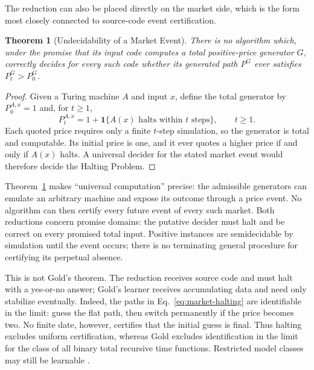 \documentclass[aps,pra,reprint,superscriptaddress,amsmath,amssymb,floatfix]{revtex4-2}
\theoremstyle{plain}
\newtheorem{theorem}{Theorem}
\theoremstyle{definition}
\theoremstyle{remark}
\begin{document}
The reduction can also be placed directly on the market side, which is the
form most closely connected to source-code event certification.

\begin{theorem}[Undecidability of a Market Event]
  \label{thm:market-undecidable}
  There is no algorithm which, under the promise that its input code computes
  a total positive-price generator \(G\), correctly decides for every such
  code whether its generated path \(P^G\) ever satisfies \(P_t^G>P_0^G\).
\end{theorem}

\begin{proof}
Given a Turing machine \(A\) and input \(x\), define the total generator by
\(P_0^{A,x}=1\) and, for \(t\geq1\),
\begin{equation}
  P_t^{A,x}
  =1+\mathbf{1}\{A(x)\text{ halts within }t\text{ steps}\},
  \qquad t\geq1 .
  \label{eq:market-halting}
\end{equation}
Each quoted price requires only a finite \(t\)-step simulation, so the
generator is total and computable. Its initial price is one, and it ever quotes
a higher price if and only if \(A(x)\) halts. A universal decider for the stated
market event would therefore decide the Halting Problem.
\end{proof}

Theorem~\ref{thm:market-undecidable} makes ``universal computation'' precise:
the admissible generators can emulate an arbitrary machine and expose its
outcome through a price event. No algorithm can then certify every future
event of every such market. Both reductions concern promise domains: the
putative decider must halt and be correct on every promised total input.
Positive instances are semidecidable by simulation until the event occurs;
there is no terminating general procedure for certifying its perpetual absence.

This is not Gold's theorem. The reduction receives source code and must halt
with a yes-or-no answer; Gold's learner receives accumulating data and need
only stabilize eventually. Indeed, the paths in
Eq.~\eqref{eq:market-halting} are identifiable in the limit: guess the flat
path, then switch permanently if the price becomes two. No finite date,
however, certifies that the initial guess is final. Thus halting excludes
uniform certification, whereas Gold excludes identification in the limit for
the class of all binary total recursive time functions. Restricted model
classes may still be learnable
\cite{blum75blum,angluin:83,ad-91,2016-AlexanderKarlSvozil-ml,moore}.
\end{document}

